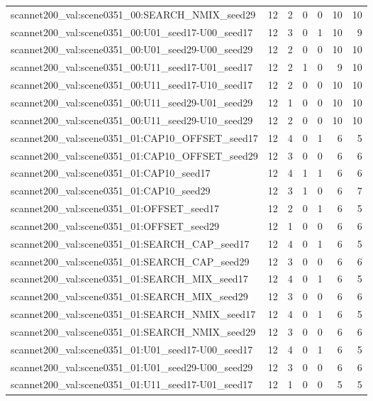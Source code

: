 \begin{table}[t]
\begin{tabular}{lrrrrrr}
scannet200\_val:scene0351\_00:SEARCH\_NMIX\_seed29 & 12 & 2 & 0 & 0 & 10 & 10 \\
scannet200\_val:scene0351\_00:U01\_seed17-U00\_seed17 & 12 & 3 & 0 & 1 & 10 & 9 \\
scannet200\_val:scene0351\_00:U01\_seed29-U00\_seed29 & 12 & 2 & 0 & 0 & 10 & 10 \\
scannet200\_val:scene0351\_00:U11\_seed17-U01\_seed17 & 12 & 2 & 1 & 0 & 9 & 10 \\
scannet200\_val:scene0351\_00:U11\_seed17-U10\_seed17 & 12 & 2 & 0 & 0 & 10 & 10 \\
scannet200\_val:scene0351\_00:U11\_seed29-U01\_seed29 & 12 & 1 & 0 & 0 & 10 & 10 \\
scannet200\_val:scene0351\_00:U11\_seed29-U10\_seed29 & 12 & 2 & 0 & 0 & 10 & 10 \\
scannet200\_val:scene0351\_01:CAP10\_OFFSET\_seed17 & 12 & 4 & 0 & 1 & 6 & 5 \\
scannet200\_val:scene0351\_01:CAP10\_OFFSET\_seed29 & 12 & 3 & 0 & 0 & 6 & 6 \\
scannet200\_val:scene0351\_01:CAP10\_seed17 & 12 & 4 & 1 & 1 & 6 & 6 \\
scannet200\_val:scene0351\_01:CAP10\_seed29 & 12 & 3 & 1 & 0 & 6 & 7 \\
scannet200\_val:scene0351\_01:OFFSET\_seed17 & 12 & 2 & 0 & 1 & 6 & 5 \\
scannet200\_val:scene0351\_01:OFFSET\_seed29 & 12 & 1 & 0 & 0 & 6 & 6 \\
scannet200\_val:scene0351\_01:SEARCH\_CAP\_seed17 & 12 & 4 & 0 & 1 & 6 & 5 \\
scannet200\_val:scene0351\_01:SEARCH\_CAP\_seed29 & 12 & 3 & 0 & 0 & 6 & 6 \\
scannet200\_val:scene0351\_01:SEARCH\_MIX\_seed17 & 12 & 4 & 0 & 1 & 6 & 5 \\
scannet200\_val:scene0351\_01:SEARCH\_MIX\_seed29 & 12 & 3 & 0 & 0 & 6 & 6 \\
scannet200\_val:scene0351\_01:SEARCH\_NMIX\_seed17 & 12 & 4 & 0 & 1 & 6 & 5 \\
scannet200\_val:scene0351\_01:SEARCH\_NMIX\_seed29 & 12 & 3 & 0 & 0 & 6 & 6 \\
scannet200\_val:scene0351\_01:U01\_seed17-U00\_seed17 & 12 & 4 & 0 & 1 & 6 & 5 \\
scannet200\_val:scene0351\_01:U01\_seed29-U00\_seed29 & 12 & 3 & 0 & 0 & 6 & 6 \\
scannet200\_val:scene0351\_01:U11\_seed17-U01\_seed17 & 12 & 1 & 0 & 0 & 5 & 5 \\

\end{tabular}
\end{table}
